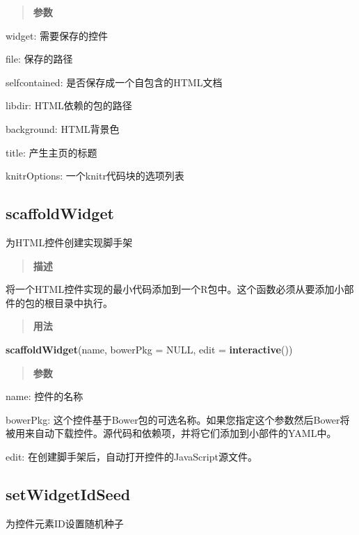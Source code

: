 \documentclass[]{book}
\newenvironment{Shaded}{\begin{snugshade}}{\end{snugshade}}
\newcommand{\KeywordTok}[1]{\textcolor[rgb]{0.13,0.29,0.53}{\textbf{#1}}}
\newcommand{\DataTypeTok}[1]{\textcolor[rgb]{0.13,0.29,0.53}{#1}}
\newcommand{\OtherTok}[1]{\textcolor[rgb]{0.56,0.35,0.01}{#1}}
\newcommand{\NormalTok}[1]{#1}
\theoremstyle{definition}
\theoremstyle{definition}
\theoremstyle{definition}
\theoremstyle{remark}
\begin{document}
\begin{quote}
\textbf{参数}
\end{quote}

widget: 需要保存的控件

file: 保存的路径

selfcontained: 是否保存成一个自包含的HTML文档

libdir: HTML依赖的包的路径

background: HTML背景色

title: 产生主页的标题

knitrOptions: 一个knitr代码块的选项列表

\subsection{scaffoldWidget}\label{scaffoldwidget}

为HTML控件创建实现脚手架

\begin{quote}
\textbf{描述}
\end{quote}

将一个HTML控件实现的最小代码添加到一个R包中。这个函数必须从要添加小部件的包的根目录中执行。

\begin{quote}
\textbf{用法}
\end{quote}

\begin{Shaded}
\begin{Highlighting}[]
\KeywordTok{scaffoldWidget}\NormalTok{(name, }\DataTypeTok{bowerPkg =} \OtherTok{NULL}\NormalTok{, }\DataTypeTok{edit =} \KeywordTok{interactive}\NormalTok{())}
\end{Highlighting}
\end{Shaded}

\begin{quote}
\textbf{参数}
\end{quote}

name: 控件的名称

bowerPkg:
这个控件基于Bower包的可选名称。如果您指定这个参数然后Bower将被用来自动下载控件。源代码和依赖项，并将它们添加到小部件的YAML中。

edit: 在创建脚手架后，自动打开控件的JavaScript源文件。

\subsection{setWidgetIdSeed}\label{setwidgetidseed}

为控件元素ID设置随机种子
\end{document}
